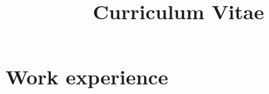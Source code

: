 \documentclass[11pt,a4paper,sans]{moderncv}
\title{Curriculum Vitae}
\begin{document}
\newcommand{\nicehref}[2] {
	\hspace*{-1mm}\underline{\href{#1}{#2}}\hspace*{-1mm}
}

\newcommand{\nicehrefspacious}[2] {
	\underline{\href{#1}{#2}}
}

\newcommand{\cvlistitemtight}[1]{
	\hspace*{-2cm}\cvlistitem{#1}
}

\newcommand{\cvlistdoubleitemtight}[2]{
	\hspace*{-2cm}\cvlistdoubleitem{#1}{#2}
}

\makecvtitle
\vspace*{-5mm}

\section{Work experience}
\end{document}
